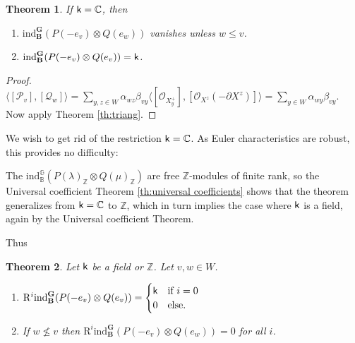 \documentclass[sn-mathphys-num]{sn-jnl}%
\newcommand\tP{{\mathcal P}}
\newcommand\tQ{{\mathcal Q}}
\newcommand{\Oo}{\mathcal O}
\newcommand{\RR}{\mathrm R}
\newcommand{\ind}{{\mathrm{ind}}}
\newcommand{\sk}{{\sf k}}
\newcommand{\Gm}{\mathbb G}
\newcommand{\Bm}{\mathbb B}
\newcommand{\Z}{{\mathbb Z}}
\newcommand{\cC}{{\mathbb C}}
\newcommand{\bg}{\mathbf G}
\newcommand{\fb}{\mathbf B}
\def\text#1{\mbox{#1}}
\newtheorem{theorem}{Theorem}[section]
\theoremstyle{definition}
\begin{document}
\begin{theorem}\label{th:indSteinberg_vanishing}
If $\sk=\cC$, then
\begin{enumerate}
\item
$\ind_{\fb}^ \bg (P(-e_v)\otimes Q(e_w))$ vanishes unless $w\leq v$.
\item
$\ind_{\fb}^ \bg (P(-e_v)\otimes Q(e_v))=\sk$.
\end{enumerate}
\end{theorem}
\begin{proof}
$\langle[\tP_v],[\tQ_w]\rangle=\sum_{y, z\in W}\alpha_{wz}\beta_{vy}\langle[\Oo_{X^+_y}],[\Oo_{X^z}(-\partial X^z)]\rangle
=\sum_{y\in W}\alpha_{wy}\beta_{vy}$.
Now apply Theorem \ref{th:triang}.
\end{proof}
We wish to get rid of the restriction $\sk=\cC$.
As Euler characteristics are robust, this provides no difficulty:

The $\ind_{\Bm}^{\Gm} (P(\lambda)_\Z\otimes Q(\mu)_\Z)$ are 
free $\Z$-modules of finite rank,
so the Universal coefficient Theorem \ref{th:universal coefficients}
shows that the  theorem generalizes from $\sk=\cC$
to $\Z$, which in turn implies the case where $\sk$ is a field, again by the Universal coefficient Theorem.


Thus

\begin{theorem}\label{th:indPQ}Let $\sk$ be a field or $\Z$.
Let $v,w\in W$.
\begin{enumerate}
\item $\RR^i\ind_\fb^\bg (P(-e_v)\otimes Q(e_v))=\begin{cases}\sk &\text{if $i=0$}\\
0&\text{else.}\end{cases}$
\item If $w\not\leq v$ then $\RR^i\ind_\fb^\bg (P(-e_v)\otimes Q(e_w))=0$ for all $i$.
\end{enumerate}
\end{theorem}
\end{document}
